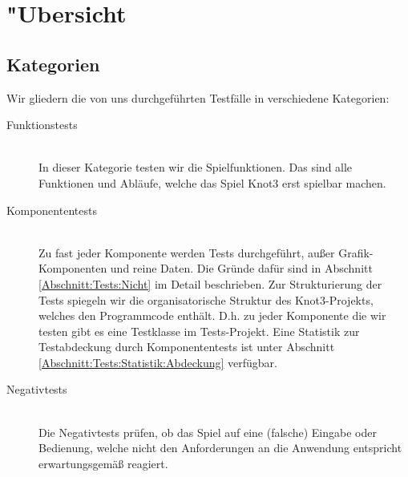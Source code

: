 %



\section{{"U}bersicht}
\label{Abschnitt:Tests:Uebersicht}



\subsection{Kategorien}
\label{Abschnitt:Tests:Uebersicht:Kategorien}

Wir gliedern die von uns durchgeführten Testfälle in verschiedene Kategorien:\\


\begin{description} %


	\item[Funktionstests] \hfill
	\\
	
	In dieser Kategorie testen wir die Spielfunktionen. Das sind alle Funktionen und Abläufe, welche das Spiel Knot3 erst spielbar machen.
	  
	
	\item[Komponententests] \hfill
	\\
	
	Zu fast jeder Komponente werden Tests durchgeführt, außer Grafik-Komponenten und reine Daten. Die Gründe dafür sind in Abschnitt \ref{Abschnitt:Tests:Nicht} im Detail beschrieben. Zur Strukturierung der Tests spiegeln wir die organisatorische Struktur des Knot3-Projekts, welches den Programmcode enthält. D.h. zu jeder Komponente die wir testen gibt es eine Testklasse im Tests-Projekt. Eine Statistik zur Testabdeckung durch Komponententests ist unter Abschnitt \ref{Abschnitt:Tests:Statistik:Abdeckung} verfügbar.\\


	\item[Negativtests] \hfill
	\\
	
	Die Negativtests prüfen, ob das Spiel auf eine (falsche) Eingabe oder Bedienung, welche nicht den Anforderungen an die Anwendung entspricht erwartungsgemäß reagiert. \\
	

\end{description}
